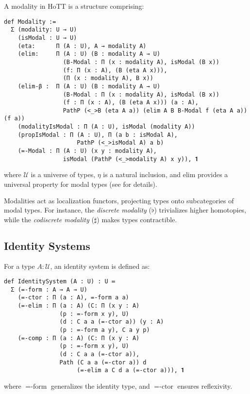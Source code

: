 \documentclass{article}
\begin{document}
\begin{definition}[Modality]
A modality in HoTT is a structure comprising:
\begin{lstlisting}[mathescape=true]
def Modality :=
  Σ (modality: U → U)
    (isModal : U → U)
    (eta:      Π (A : U), A → modality A)
    (elim:     Π (A : U) (B : modality A → U)
                 (B-Modal : Π (x : modality A), isModal (B x))
                 (f: П (x : A), (B (eta A x))),
                 (Π (x : modality A), B x))
    (elim-β :  Π (A : U) (B : modality A → U)
                 (B-Modal : Π (x : modality A), isModal (B x))
                 (f : Π (x : A), (B (eta A x))) (a : A),
                 PathP (<_>B (eta A a)) (elim A B B-Modal f (eta A a)) (f a))
    (modalityIsModal : Π (A : U), isModal (modality A))
    (propIsModal : Π (A : U), Π (a b : isModal A),
                     PathP (<_>isModal A) a b)
    (=-Modal : Π (A : U) (x y : modality A),
                 isModal (PathP (<_>modality A) x y)), 𝟏
\end{lstlisting}
where $\mathcal{U}$ is a universe of types, $\eta$ is a natural inclusion, and $\text{elim}$ provides a universal property for modal types (see \cite{shulman2018modal} for details).
\end{definition}

Modalities act as localization functors, projecting types onto subcategories of modal types. For instance, the \emph{discrete modality} ($\flat$) trivializes higher homotopies, while the \emph{codiscrete modality} ($\sharp$) makes types contractible.

\newpage
\subsection{Identity Systems}

\begin{definition}
For a type $A: \mathcal{U}$, an identity system is defined as:
\begin{lstlisting}[mathescape=true]
def IdentitySystem (A : U) : U ≔
  Σ (=-form : A → A → U)
    (=-ctor : Π (a : A), =-form a a)
    (=-elim : Π (a : A) (C: Π (x y : A)
                (p : =-form x y), U)
                (d : C a a (=-ctor a)) (y : A)
                (p : =-form a y), C a y p)
    (=-comp : Π (a : A) (C: Π (x y : A)
                (p : =-form x y), U)
                (d : C a a (=-ctor a)),
                Path (C a a (=-ctor a)) d
                     (=-elim a C d a (=-ctor a))), 𝟏
\end{lstlisting}
where $=\text{-form}$ generalizes the identity type, and $=\text{-ctor}$ ensures reflexivity.
\end{definition}
\end{document}
